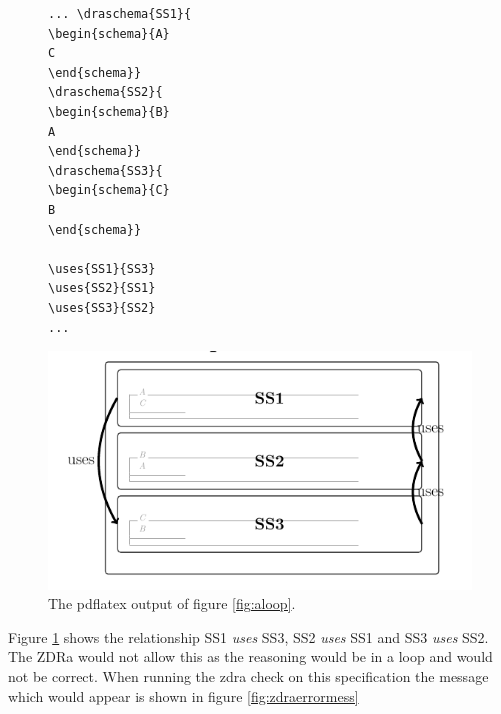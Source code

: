 \begin{figure}[H]
\vspace{-0.2in}
\centering
\begin{minipage}{0.45\textwidth}
\centering
\begin{scriptsize}
\begin{BVerbatim}
... \draschema{SS1}{
\begin{schema}{A}
C
\end{schema}}
\draschema{SS2}{
\begin{schema}{B}
A
\end{schema}}
\draschema{SS3}{
\begin{schema}{C}
B
\end{schema}}

\uses{SS1}{SS3}
\uses{SS2}{SS1}
\uses{SS3}{SS2}
...
\end{BVerbatim}
\end{scriptsize}
\vspace{-0.18in}
\caption{An example of a loop in the reasoning in a labelled ZDRa specification.\label{fig:aloop}}
\vspace{-0.2in}
\end{minipage}\hfill
\begin{minipage}{0.45\textwidth}
\centering
\includegraphics[scale=0.33]{Figures/zdra/zdraloop.png}
\vspace{-0.18in}
\caption{The pdflatex output of figure \ref{fig:aloop}.  \label{fig:zdraerror1}}
\vspace{-0.2in}
\end{minipage}
\end{figure}

Figure \ref{fig:zdraerror1} shows the relationship SS1 \textit{uses} SS3, SS2
\textit{uses} SS1 and SS3 \textit{uses} SS2. The ZDRa would not allow this as
the reasoning would be in a loop and would not be correct. When running the
\gls{zdra} check on this specification the message which would appear is shown
in figure \ref{fig:zdraerrormess}


